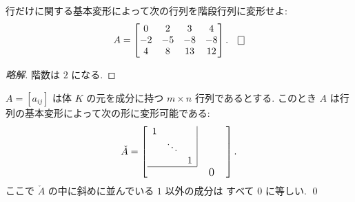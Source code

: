 \documentclass[12pt,twoside]{jarticle}
\newcommand\commentout[1]{#1}
\newcommand\commentout[1]{}
\begin{document}
\begin{question}[5点]
  \label{q:kaidan-3}
  行だけに関する基本変形によって次の行列を階段行列に変形せよ:
  \begin{equation*}
    A = 
    \begin{bmatrix}
       0 &  2 &  3 &  4 \\
      -2 & -5 & -8 & -8 \\
       4 &  8 & 13 & 12 \\
    \end{bmatrix}.
    \qed
  \end{equation*}
\end{question}

\commentout{
\begin{proof}[略解]
  階数は $2$ になる.
\end{proof}
}


\begin{question}[行列の基本変形による行列の簡単化, 10点]
  \label{q:PAQ}
  $A=[a_{ij}]$ は体 $K$ の元を成分に持つ $m\times n$ 行列であるとする.
  このとき $A$ は行列の基本変形によって次の形に変形可能である:
  \begin{equation*}
    \check{A} = 
    \left[
      \begin{array}{cccc}
        1 &        & \multicolumn{1}{c|}{}  & \qquad \\
          & \ddots & \multicolumn{1}{c|}{}  & \qquad \\
          &        & \multicolumn{1}{c|}{1} & \qquad \\
        \cline{1-3}
        \vphantom{\bigzerol} & & & \bigzerou \\
      \end{array}
    \right].
  \end{equation*}
  ここで $\check{A}$ の中に斜めに並んでいる $1$ 以外の成分は
  すべて $0$ に等しい.
  \qed
\end{question}
\end{document}
